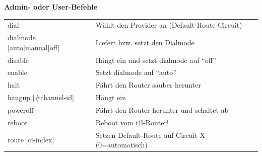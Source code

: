   \begin{table}
    \textbf{Admin- oder User-Befehle}

    \vspace{1ex}
    \begin{tabular}{lp{9cm}}

      dial                      &    Wählt den Provider an
                                     (Default-Route-Circuit) \\
      dialmode [auto|manual|off]&    Liefert bzw. setzt den Dialmode \\
      disable                   &    Hängt ein und setzt dialmode auf ``off''
                                      \\
      enable                    &    Setzt dialmode auf ``auto'' \\
      halt                      &    Fährt den Router sauber herunter \\
      hangup [\#channel-id]     &    Hängt ein \\
      poweroff                  &    Fährt den Router herunter und schaltet ab \\
      reboot                    &    Reboot vom i4l-Router! \\
      route [ci-index]          &    Setzen Default-Route auf Circuit X
                                     (0=automatisch) \\
    \end{tabular}
  \end{table}


